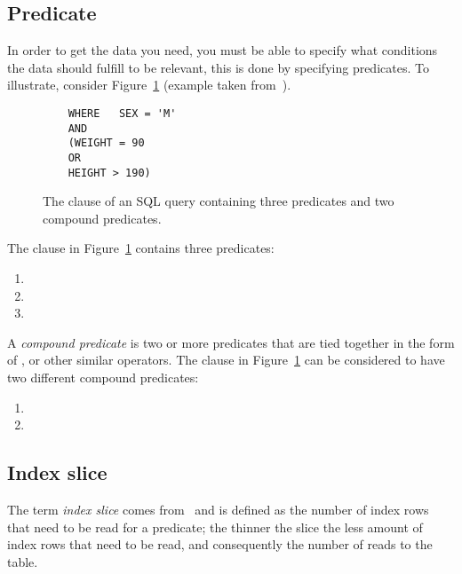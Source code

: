 \subsection*{Predicate}
In order to get the data you need, you must be able to specify what conditions
the data should fulfill to be relevant, this is done by specifying predicates.
To illustrate, consider Figure~\ref{fig:sql:predicate} (example taken
from~\cite{lahdenmaki_2005_relational_rdidatodossea}).

\begin{figure}[ht]
  \begin{verbatim}
    WHERE   SEX = 'M'
    AND
    (WEIGHT = 90
    OR
    HEIGHT > 190)
  \end{verbatim}
  \caption[The  clause of a query containing three predicates and two
  compound predicates]{The  clause of an SQL query containing three
    predicates and two compound predicates.}\label{fig:sql:predicate}
\end{figure}

The  clause in Figure~\ref{fig:sql:predicate} contains three
predicates:
\begin{enumerate}
\item {}
\item {}
\item {}
\end{enumerate}

A \textit{compound predicate} is two or more predicates that are tied together
in the form of ,  or other similar operators. The 
clause in Figure~\ref{fig:sql:predicate} can be considered to have two different
compound predicates:
\begin{enumerate}
\item {}
\item {}
\end{enumerate}

\subsection*{Index slice}
The term \textit{index slice} comes
from~\cite{lahdenmaki_2005_relational_rdidatodossea} and is defined as the
number of index rows that need to be read for a predicate; the thinner the slice
the less amount of index rows that need to be read, and consequently the number
of reads to the table.

